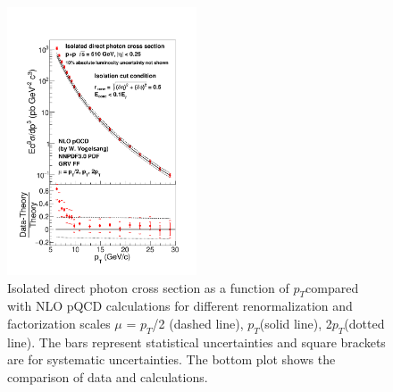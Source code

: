\documentclass[twocolumn,letterpaper,aps,prl,longbibliography,superscriptaddress,floatfix]{revtex4-2}
\newcommand{\pT}{\ensuremath{p_T}}
\newcommand{\pizero}{\ensuremath{\pi^0}}
\begin{document}
\begin{figure} 
\centering
\includegraphics[width=0.5\textwidth]{CrossSection-isophoton-werner}
\caption{Isolated direct photon cross section as a function of \pT compared with NLO pQCD calculations \cite{PhysRevD.48.3136,PhysRevD.50.1901} for different renormalization and factorization scales $\mu$ = \pT/2 (dashed line), \pT (solid line), 2\pT (dotted line). The bars represent statistical uncertainties and square brackets are for systematic uncertainties. The bottom plot shows the comparison of data and calculations.}
\label{fig:iso}
\end{figure}

\end{document}
